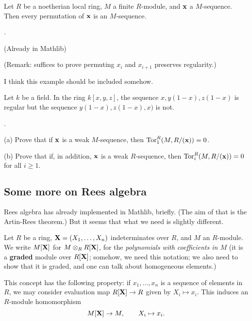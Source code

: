 	
	\begin{proposition}
		Let $R$ be a noetherian local ring, $M$ a finite $R$-module, and $\mathbf{x}$ a $M$-sequence. Then every permutation of $\mathbf{x}$ is an $M$-sequence.
		
		\cite[\href{https://stacks.math.columbia.edu/tag/00LJ}{Lemma 00LJ}]{stacks-project}.
		
		(Already in Mathlib)
		
	\end{proposition}
	(Remark: suffices to prove permuting $x_i$ and $x_{i+1}$ preserves regularity.)
	
	\begin{example}
		I think this example should be included somehow.
		
		Let $k$ be a field. In the ring $k[x,y,z]$, the sequence $x,y(1-x),z(1-x)$ is regular but the sequence $y(1-x), z(1-x), x)$ is not.
		
		\cite[\href{https://stacks.math.columbia.edu/tag/00LG}{Example 00LG}]{stacks-project}.
	\end{example}
	
	\begin{lemma}
		(a) Prove that if $\mathbf{x}$ is a weak $M$-sequence, then $\operatorname{Tor}^R_1(M, R/(\mathbf{x})) = 0$.
		
		(b) Prove that if, in addition, $\mathbf{x}$ is a weak $R$-sequence, then $\operatorname{Tor}^R_i(M, R/(\mathbf{x})) = 0$ for all $i \geq 1$.
	\end{lemma}
	
	
	\subsection{Some more on Rees algebra}
	Rees algebra has already implemented in Mathlib, briefly. (The aim of that is the Artin-Rees theorem.)  But it seems that what we need is slightly different.
	
	
	
	\begin{notation}
		\label{N:construction of M[X]}
		Let $R$ be a ring, $\mathbf{X} = (X_1, \dots, X_n)$ indeterminates over $R$, and $M$ an $R$-module. We write $M[\mathbf{X}]$ for $M \otimes_R R[\mathbf{X}]$, for the \emph{polynomials with coefficients in $M$} (it is a {\bf graded} module over $R[\mathbf{X}]$; somehow, we need this notation; we also need to show that it is graded, and one can talk about homogeneous elements.)
		
		This concept has the following property: if $x_1, \dots, x_n$ is a sequence of elements in $R$, we may consider evaluation map $R[\mathbf{X}] \to R$ given by $X_i \mapsto x_i$. This induces an $R$-module homomorphism
		$$
		M[\mathbf{X}] \to M, \qquad X_i \mapsto x_i.
		$$
	\end{notation}
	
